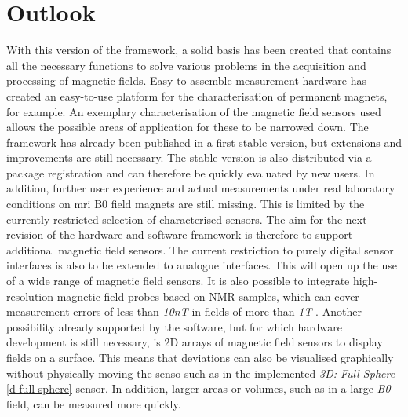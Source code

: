 \hypertarget{outlook}{%
\section{Outlook}\label{outlook}}

With this version of the framework, a solid basis has been created that
contains all the necessary functions to solve various problems in the
acquisition and processing of magnetic fields. Easy-to-assemble
measurement hardware has created an easy-to-use platform for the
characterisation of permanent magnets, for example. An exemplary
characterisation of the magnetic field sensors used allows the possible
areas of application for these to be narrowed down. The framework has
already been published in a first stable version, but extensions and
improvements are still necessary. The stable version is also distributed
via a package registration and can therefore be quickly evaluated by new
users. In addition, further user experience and actual measurements
under real laboratory conditions on \gls{mri} B0 field magnets are still
missing. This is limited by the currently restricted selection of
characterised sensors. The aim for the next revision of the hardware and
software framework is therefore to support additional magnetic field
sensors. The current restriction to purely digital sensor interfaces is
also to be extended to analogue interfaces. This will open up the use of
a wide range of magnetic field sensors. It is also possible to integrate
high-resolution magnetic field probes based on NMR samples, which can
cover measurement errors of less than \emph{10nT} in fields of more than
\emph{1T} . Another possibility already supported by the
software, but for which hardware development is still necessary, is 2D
arrays of magnetic field sensors to display fields on a
surface. This means that deviations can also be
visualised graphically without physically moving the senso such as in
the implemented \emph{3D: Full Sphere} \ref{d-full-sphere} sensor. In
addition, larger areas or volumes, such as in a large \emph{B0} field,
can be measured more quickly.

